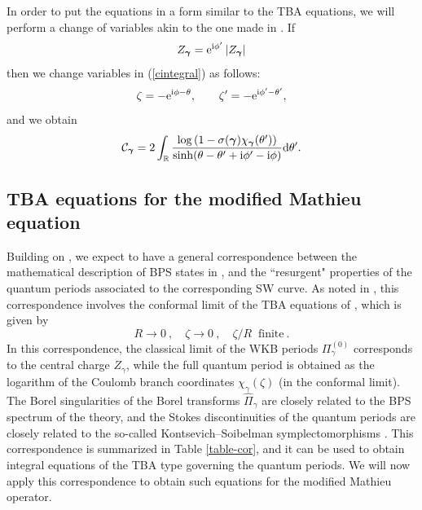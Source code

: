 \documentclass[a4paper,11pt]{article}
\theoremstyle{definition}
\newcommand{\CC}{{\cal C}}
\def\IR{{\mathbb R}}
\newcommand{\re}{{\rm e}}
\newcommand{\ri}{{\rm i}}
\newcommand{\rd}{{\rm d}}
\newcommand{\bs}{\boldsymbol}
\def\IR{\mathbb{R}}
\begin{document}
In order to put the equations in a form similar to the TBA equations,
we will perform a change of variables akin to the one made in
\cite{gmn}. If
\begin{equation}
  Z_{\bs{\gamma}}= \re^{\ri \phi'} \left|  Z_{\bs{\gamma}} \right|
\end{equation}
then we change variables in (\ref{cintegral}) as follows:
\begin{equation}
  \zeta= -\re^{\ri \phi -\theta}, \qquad \zeta'=  -\re^{\ri \phi' -\theta'}, 
\end{equation}
and we obtain
\begin{equation}
  \CC_{\bs{\gamma}}= 2\int_\IR { \log\left(1- \sigma(\bs{\gamma})
      \chi_{\bs{\gamma}} (\theta') \right) \over \sinh(
    \theta-\theta'+ \ri \phi'-\ri \phi)} \rd \theta'.  
\end{equation}

\subsection{TBA equations for the modified Mathieu equation}
\label{sc:SW-TBA}

Building on \cite{oper, ims}, we expect to have a general
correspondence between the mathematical description of BPS states in \cite{gmn,gmn2}, and the ``resurgent"
properties of the quantum periods associated to the corresponding SW curve. As noted in \cite{oper}, this correspondence involves the conformal limit of the 
TBA equations of \cite{gmn}, which is given by
%
\begin{equation}
  R\to 0 \ , \quad \zeta \to 0\ ,\quad  \zeta/R\;\; \text{finite} \ .
\end{equation}
%
In this correspondence, the classical limit of the WKB periods
$\Pi_\gamma ^{(0)}$ corresponds to the central charge $Z_\gamma$,
while the full quantum period is obtained as the logarithm of the
Coulomb branch coordinates $\chi_\gamma(\zeta)$ (in the conformal
limit). The Borel singularities of the Borel transforms
$\widehat \Pi_\gamma$ are closely related to the BPS spectrum of the
theory, and the Stokes discontinuities of the quantum periods are
closely related to the so-called Kontsevich--Soibelman
symplectomorphisms \cite{ks, gmn,gmn2}. This correspondence is
summarized in Table \ref{table-cor}, and it can be used to obtain
integral equations of the TBA type governing the quantum periods. We
will now apply this correspondence to obtain such equations for the
modified Mathieu operator.
\end{document}
